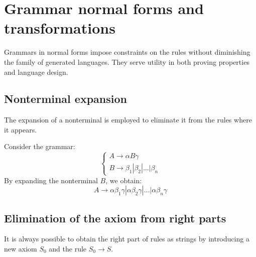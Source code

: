 \section{Grammar normal forms and transformations}

Grammars in normal forms impose constraints on the rules without diminishing the family of generated languages. 
They serve utility in both proving properties and language design.

\subsection{Nonterminal expansion}
The expansion of a nonterminal is employed to eliminate it from the rules where it appears.
\begin{example}
    Consider the grammar: 
    \[\begin{cases}
        A \rightarrow \alpha B \gamma \\
        B \rightarrow \beta_1|\beta_2|\dots|\beta_n
    \end{cases}\]
    By expanding the nonterminal $B$, we obtain:
    \[A \rightarrow \alpha\beta_1\gamma|\alpha\beta_2\gamma|\dots|\alpha\beta_n\gamma\]
\end{example}

\subsection{Elimination of the axiom from right parts}
It is always possible to obtain the right part of rules as strings by introducing a new axiom $S_0$ and the rule $S_0 \rightarrow S$.

